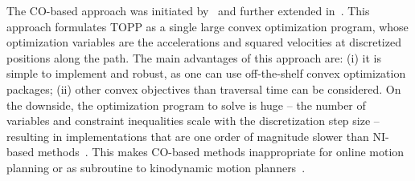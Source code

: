 \documentclass[journal]{IEEEtran}
\theoremstyle{plain}
\theoremstyle{definition}
\theoremstyle{definition}
\begin{document}
The CO-based approach was initiated by~\cite{verscheure2008practical}
and further extended in~\cite{hauser2014}. This approach formulates
TOPP as a single large convex optimization program, whose optimization
variables are the accelerations and squared velocities at discretized
positions along the path. The main advantages of this approach are:
(i) it is simple to implement and robust, as one can use
off-the-shelf convex optimization packages; (ii) other convex
objectives than traversal time can be considered. On the downside, the
optimization program to solve is huge -- the number of variables and
constraint inequalities scale with the discretization step size --
resulting in implementations that are one order of magnitude slower
than NI-based methods~\cite{pham2014general}. This makes CO-based
methods inappropriate for online motion planning or as subroutine to
kinodynamic motion planners~\cite{pham2017admissible}.
\end{document}
